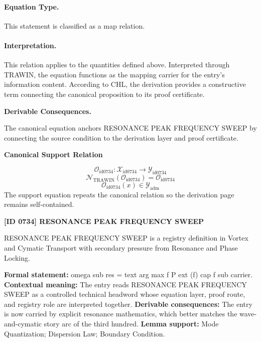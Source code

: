 \paragraph{Equation Type.}
This statement is classified as a map relation.

\paragraph{Interpretation.}
This relation applies to the quantities defined above. Interpreted through TRAWIN, the equation functions as the mapping carrier for the entry’s information content. According to CHL, the derivation provides a constructive term connecting the canonical proposition to its proof certificate.

\par\vspace{0.35em}
\noindent\textbf{Derivable Consequences.}\quad
\begingroup
\footnotesize
\raggedright
The canonical equation anchors RESONANCE PEAK FREQUENCY SWEEP by connecting the source condition to the derivation layer and proof certificate.
\par\endgroup

\noindent\textbf{Canonical Support Relation}\par
\[
\mathcal{O}_{\mathrm{id0734}}:\mathcal{X}_{\mathrm{id0734}}\longrightarrow\mathcal{Y}_{\mathrm{id0734}}
\]
\[
\mathcal{N}_{\mathrm{TRAWIN}}(\mathcal{O}_{\mathrm{id0734}})=\mathcal{O}_{\mathrm{id0734}}
\]
\[
\mathcal{O}_{\mathrm{id0734}}(x)\in\mathcal{Y}_{\mathrm{adm}}
\]
\noindent The support equation repeats the canonical relation so the derivation page remains self-contained.\par

\clearpage
\noindent\textbf{[ID 0734] RESONANCE PEAK FREQUENCY SWEEP}\par
\vspace{0.35em}
\begingroup\small
{}
RESONANCE PEAK FREQUENCY SWEEP is a registry definition in Vortex and Cymatic Transport with secondary pressure from Resonance and Phase Locking.

\begingroup\footnotesize\setlength{\emergencystretch}{3em}\sloppy
\textbf{Formal statement:} omega sub res = text arg max f P ext (f) cap f sub carrier. \textbf{Contextual meaning:} The entry reads RESONANCE PEAK FREQUENCY SWEEP as a controlled technical headword whose equation layer, proof route, and registry role are interpreted together. \textbf{Derivable consequences:} The entry is now carried by explicit resonance mathematics, which better matches the wave-and-cymatic story arc of the third hundred. \textbf{Lemma support:} Mode Quantization; Dispersion Law; Boundary Condition.\par
\endgroup

